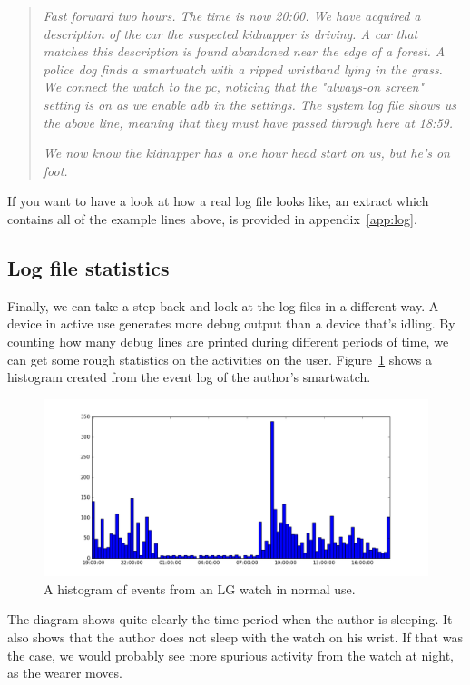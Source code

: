 \documentclass[a4paper,11pt,dvips]{article}
\begin{document}
\begin{quote}
\textit{Fast forward two hours. The time is now 20:00. We have acquired a description of the car the suspected kidnapper is driving. A car that matches this description is found abandoned near the edge of a forest. A police dog finds a smartwatch with a ripped wristband lying in the grass. We connect the watch to the pc, noticing that the "always-on screen" setting is on as we enable adb in the settings. The system log file shows us the above line, meaning that they must have passed through here at 18:59.}

\textit{We now know the kidnapper has a one hour head start on us, but he's on foot.}
\end{quote}

\noindent
If you want to have a look at how a real log file looks like, an extract which contains all of the example lines above, is provided in appendix~\ref{app:log}.


\subsection{Log file statistics}

Finally, we can take a step back and look at the log files in a different way. A device in active use generates more debug output than a device that's idling. By counting how many debug lines are printed during different periods of time, we can get some rough statistics on the activities on the user. Figure~\ref{fig:eventlog} shows a histogram created from the event log of the author's smartwatch.

\begin{figure}
\noindent
\includegraphics[natwidth=1301bp,natheight=600bp,width=\linewidth]{eventlog}
\caption{A histogram of events from an LG watch in normal use.}
\label{fig:eventlog}
\end{figure}

\noindent
The diagram shows quite clearly the time period when the author is sleeping. It also shows that the author does not sleep with the watch on his wrist. If that was the case, we would probably see more spurious activity from the watch at night, as the wearer moves.
\end{document}

